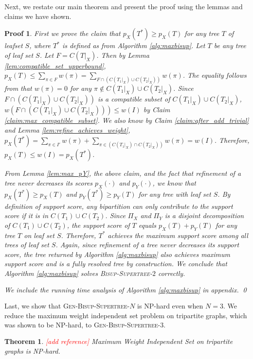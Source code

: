 \documentclass{bmcart}
\newcommand{\note}[1]{\textcolor{red}{#1}}
\newcommand{\bisuptwo}{\textsc{Bisup-Supertree-$2$}\xspace}
\newcommand{\genbisup}{\textsc{Gen-Bisup-Supertree-$N$}\xspace}
\newcommand{\genbisupthree}{\textsc{Gen-Bisup-Supertree-$3$}\xspace}
\theoremstyle{mystyle}
\newtheorem{theorem}{Theorem}
\theoremstyle{proofstyle}
\newtheorem*{proof2}{Proof}
\newenvironment{proofnospace}{\begin{proof2}}{\qed \end{proof2}}
\begin{document}
Next, we restate our main theorem and present the proof using the lemmas and claims we have shown. 
\thmCorrectAlg*
\begin{proofnospace}
First we prove the claim that $p_X(T^*) \ge p_X(T)$ for any tree $T$ of leafset $S$, where $T^*$ is defined as from Algorithm \ref{alg:maxbisup}. Let $T$ be any tree of leaf set $S$. Let $F = C(T|_X)$. Then by Lemma \ref{lem:compatible_set_upperbound}, $p_X(T) \le \sum_{\pi \in F} w(\pi) = \sum_{F \cap (C(T_1|_X) \cup C(T_2|_X))} w(\pi)$. The equality follows from that $w(\pi) = 0$ for any $\pi \notin C(T_1|_X) \cup C(T_2|_X)$. Since $F \cap (C(T_1|_X) \cup C(T_2|_X))$ is a compatible subset of $C(T_1|_X) \cup C(T_2|_X)$, $w(F \cap (C(T_1|_X) \cup C(T_2|_X))) \le w(I)$ by Claim \ref{claim:max_compatible_subset}. We also know by Claim \ref{claim:after_add_trivial} and Lemma \ref{lem:refine_achieves_weight}, $p_X(T^*)= \sum_{\pi \in I'} w(\pi) + \sum_{\pi \in (C(T_1|_X )\cap C(T_2|_X))} w(\pi) = w(I)$. Therefore, $p_X(T) \le w(I) = p_X(T^*)$. \smallskip

From Lemma \ref{lem:max_pY}, the above claim, and the fact that refinement of a tree never decreases its scores $p_X(\cdot)$ and $p_Y(\cdot)$, we know that $p_X(T^*) \ge p_X(T)$ and $p_Y(T^*) \ge p_Y(T)$ for any tree with leaf set $S$. By definition of support score, any bipartition can only contribute to the support score if it is in $C(T_1) \cup C(T_2)$. Since $\Pi_X$ and $\Pi_Y$ is a disjoint decomposition of $C(T_1) \cup C(T_2)$, the support score of $T$ equals $p_X(T) + p_Y(T)$ for any tree $T$ on leaf set $S$. Therefore, $T^*$ achieves the maximum support score among all trees of leaf set $S$. Again, since refinement of a tree never decreases its support score, the tree returned by Algorithm \ref{alg:maxbisup} also achieves maximum support score and is a fully resolved tree by construction. We conclude that Algorithm \ref{alg:maxbisup} solves \bisuptwo correctly.\smallskip

We include the running time analysis of Algorithm \ref{alg:maxbisup} in appendix.\smallskip
\end{proofnospace}


Last, we show that \genbisup is NP-hard even when $N = 3$. We reduce the maximum weight independent set problem on tripartite graphs, which was shown to be NP-hard, to \genbisupthree. 

\begin{theorem}\label{thm:IS_tripartite_hardness} \note{[add reference]}
Maximum Weight Independent Set on tripartite graphs is NP-hard. 
\end{theorem}
\end{document}
